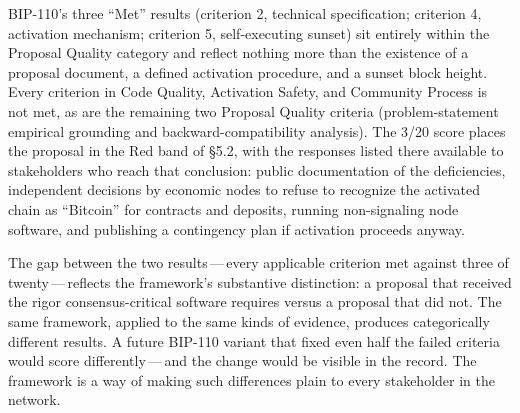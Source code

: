 \documentclass[11pt, twoside, openright]{book}
\newcommand{\sect}[1]{\S#1}
\begin{document}
BIP-110's three ``Met'' results (criterion 2, technical specification; criterion 4, activation mechanism; criterion 5, self-executing sunset) sit entirely within the Proposal Quality category and reflect nothing more than the existence of a proposal document, a defined activation procedure, and a sunset block height. Every criterion in Code Quality, Activation Safety, and Community Process is not met, as are the remaining two Proposal Quality criteria (problem-statement empirical grounding and backward-compatibility analysis). The 3/20 score places the proposal in the Red band of \sect{5.2}, with the responses listed there available to stakeholders who reach that conclusion: public documentation of the deficiencies, independent decisions by economic nodes to refuse to recognize the activated chain as ``Bitcoin'' for contracts and deposits, running non-signaling node software, and publishing a contingency plan if activation proceeds anyway.

The gap between the two results\,---\,every applicable criterion met against three of twenty\,---\,reflects the framework's substantive distinction: a proposal that received the rigor consensus-critical software requires versus a proposal that did not. The same framework, applied to the same kinds of evidence, produces categorically different results. A future BIP-110 variant that fixed even half the failed criteria would score differently\,---\,and the change would be visible in the record. The framework is a way of making such differences plain to every stakeholder in the network.
\end{document}
